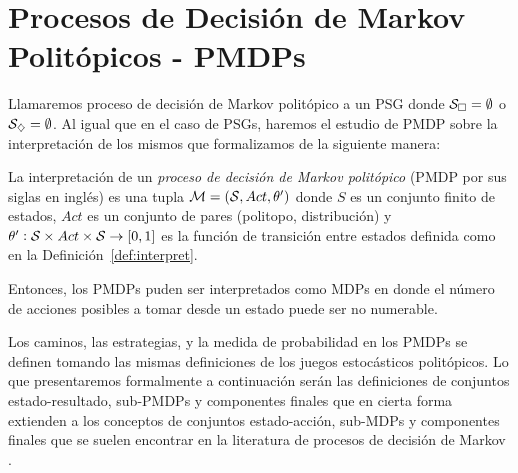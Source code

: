 \section{Procesos de Decisión de Markov Politópicos - PMDPs}
\label{sec:pmdp}

Llamaremos proceso de decisión de Markov politópico a un PSG donde $\mathcal{S}_\square =
	\emptyset$ o $\mathcal{S}_\diamondsuit = \emptyset$. Al igual que en el caso de PSGs, haremos
el estudio de PMDP sobre la interpretación de los mismos que formalizamos de la
siguiente manera:

\begin{definition}
	La interpretación de un \textit{proceso de decisión de Markov politópico} (PMDP por sus siglas en inglés) es una tupla $\mathcal{M} = (\mathcal{S}, Act, \theta')$ donde $S$ es un conjunto finito de estados, $Act$ es un conjunto de pares (politopo, distribución) y \\ $\theta': \mathcal{S} \times Act \times \mathcal{S} \rightarrow [0, 1]$ es la función de transición entre estados definida como en la Definición~\ref{def:interpret}.
\end{definition}

Entonces, los PMDPs puden ser interpretados como MDPs en donde el número de
acciones posibles a tomar desde un estado puede ser no numerable.


Los caminos, las estrategias, y la medida de probabilidad en los PMDPs se
definen tomando las mismas definiciones de los juegos estocásticos politópicos.
Lo que presentaremos formalmente a continuación serán las definiciones de
conjuntos estado-resultado, sub-PMDPs y componentes finales que en cierta forma
extienden a los conceptos de conjuntos estado-acción, sub-MDPs y componentes
finales que se suelen encontrar en la literatura de procesos de decisión de
Markov \cite{AlfaroThesis,BaierKatoen}.

